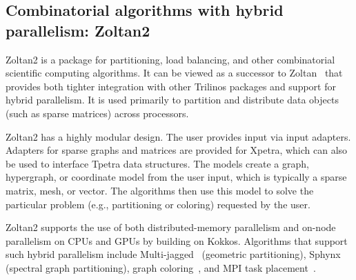 \subsection{Combinatorial algorithms with hybrid parallelism: Zoltan2}
Zoltan2 is a package for partitioning, load balancing, and other combinatorial scientific computing algorithms. It can be viewed as a successor to Zoltan~\cite{Boman2012} that provides both tighter integration with other Trilinos packages and support for hybrid parallelism. It is used primarily to partition and distribute data objects (such as sparse matrices) across processors.

Zoltan2 has a highly modular design. The user provides input via input adapters. Adapters for sparse graphs and matrices are provided for Xpetra, which can also be used to interface Tpetra data structures. The models create a graph, hypergraph, or coordinate model from the user input, which is typically a sparse matrix, mesh, or vector. The algorithms then use this model to solve the particular problem (e.g., partitioning or coloring) requested by the user.

Zoltan2 supports the use of both distributed-memory parallelism and on-node parallelism on CPUs and GPUs by building on Kokkos.
Algorithms that support such hybrid parallelism include Multi-jagged~\cite{Z1} (geometric partitioning), Sphynx~\cite{Z2} (spectral graph partitioning), graph coloring~\cite{Z5}, and MPI task placement~\cite{Z3}.
